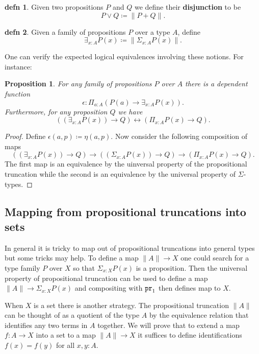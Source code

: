 \documentclass{amsart}
\theoremstyle{theorem}
\newtheorem*{prop}{Proposition}
\theoremstyle{definition}
\newtheorem*{defn}{defn}
\theoremstyle{remark}
\newcommand{\0}{\mathbbe{0}}
\newcommand{\1}{\mathbbe{1}}
\newcommand{\2}{\mathbbe{2}}
\newcommand{\3}{\mathbbe{3}}
\newcommand{\4}{\mathbbe{4}}
\newcommand{\term}[1]{{\textup{\texttt{#1}}}}
\newcommand{\pr}{\term{pr}}
\newcommand{\mere}[1]{\|{#1}\|}
\begin{document}
\begin{defn} Given two propositions $P$ and $Q$ we define their \textbf{disjunction} to be
\[ P \vee Q \coloneq \mere{P + Q}.\]
\end{defn}

\begin{defn} Given a family of propositions $P$ over a type $A$, define
\[ \exists_{x :A} P(x) \coloneq \mere{\Sigma_{x:A}P(x)}.\]
\end{defn}

One can verify the expected logical equivalences involving these notions. For instance:

\begin{prop} For any family of propositions $P$ over $A$ there is a dependent function
\[ \epsilon : \Pi_{a:A} \left( P(a) \to \exists_{x:A}P(x) \right).\]
Furthermore, for any proposition $Q$ we have
\[ \left( (\exists_{x:A}P(x)) \to Q \right) \leftrightarrow \left( \Pi_{x:A}P(x) \to Q \right).\]
\end{prop}
\begin{proof}
Define $\epsilon(a,p) \coloneq \eta(a,p)$. Now consider the following composition of maps
\[ \left( (\exists_{x:A}P(x)) \to Q \right) \to \left( (\Sigma_{x:A} P(x)) \to Q\right) \to \left( \Pi_{x:A}P(x) \to Q \right).\]
The first map is an equivalence by the uinversal property of the propositional truncation while the second is an equivalence by the universal property of $\Sigma$-types.
\end{proof}


\subsection*{Mapping from propositional truncations into sets}

In general it is tricky to map out of propositional truncations into general types but some tricks may help. To define a map $\mere{A} \to X$ one could search for a type family $P$ over $X$ so that $\Sigma_{x:X}P(x)$ is a proposition. Then the universal property of propositional truncation can be used to define a map $\mere{A} \to \Sigma_{x:X}P(x)$ and compositing with $\pr_1$ then defines  map to $X$.

When $X$ is a set there is another strategy. The propositional truncation $\mere{A}$ can be thought of as a quotient of the type $A$ by the equivalence relation that identifies any two terms in $A$ together. We will prove that to extend a map $f : A \to X$ into a set to a map $\mere{A} \to X$ it suffices to define identifications $f(x) =f(y)$ for all $x,y : A$.
\end{document}
